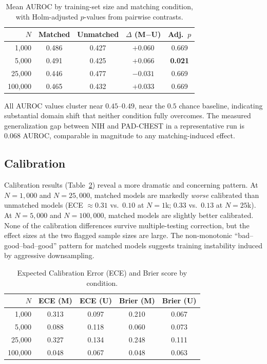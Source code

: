 \documentclass[11pt]{article}
\begin{document}
\begin{table}[h]
\centering
\caption{Mean AUROC by training-set size and matching condition, with Holm-adjusted $p$-values from pairwise contrasts.}
\label{tab:auroc}
\begin{tabular}{rcccc}
\toprule
$N$ & Matched & Unmatched & $\Delta$ (M$-$U) & Adj.\ $p$ \\
\midrule
1{,}000   & 0.486 & 0.427 & $+0.060$ & 0.669 \\
5{,}000   & 0.491 & 0.425 & $+0.066$ & \textbf{0.021} \\
25{,}000  & 0.446 & 0.477 & $-0.031$ & 0.669 \\
100{,}000 & 0.465 & 0.432 & $+0.033$ & 0.669 \\
\bottomrule
\end{tabular}
\end{table}

All AUROC values cluster near $0.45$--$0.49$, near the $0.5$ chance baseline, indicating substantial domain shift that neither condition fully overcomes. The measured generalization gap between NIH and PAD-CHEST in a representative run is $0.068$ AUROC, comparable in magnitude to any matching-induced effect.

\subsection{Calibration}
Calibration results (Table~\ref{tab:cal}) reveal a more dramatic and concerning pattern. At $N=1{,}000$ and $N=25{,}000$, matched models are markedly \emph{worse} calibrated than unmatched models (ECE $\approx 0.31$ vs.\ $0.10$ at $N=1$k; $0.33$ vs.\ $0.13$ at $N=25$k). At $N=5{,}000$ and $N=100{,}000$, matched models are slightly better calibrated. None of the calibration differences survive multiple-testing correction, but the effect sizes at the two flagged sample sizes are large. The non-monotonic ``bad--good--bad--good'' pattern for matched models suggests training instability induced by aggressive downsampling.

\begin{table}[h]
\centering
\caption{Expected Calibration Error (ECE) and Brier score by condition.}
\label{tab:cal}
\begin{tabular}{rcccc}
\toprule
$N$ & ECE (M) & ECE (U) & Brier (M) & Brier (U) \\
\midrule
1{,}000   & 0.313 & 0.097 & 0.210 & 0.067 \\
5{,}000   & 0.088 & 0.118 & 0.060 & 0.073 \\
25{,}000  & 0.327 & 0.134 & 0.248 & 0.111 \\
100{,}000 & 0.048 & 0.067 & 0.048 & 0.063 \\
\bottomrule
\end{tabular}
\end{table}
\end{document}
